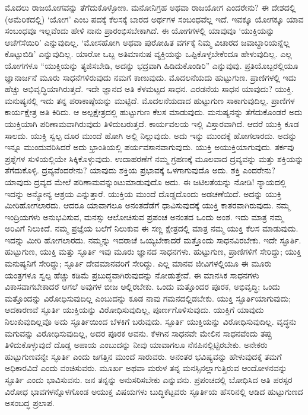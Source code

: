ಮೊದಲು ರಾಜಯೋಗವನ್ನು ತೆಗೆದುಕೊಳ್ಳೋಣ. ಮನೋನಿಗ್ರಹ ಅಥವಾ ರಾಜಯೋಗ ಎಂದರೇನು? ಈ ದೇಶದಲ್ಲಿ (ಅಮೆರಿಕದಲ್ಲಿ) ‘ಯೋಗ’ ಎಂಬ ಪದಕ್ಕೆ ಕೆಲಸಕ್ಕೆ ಬಾರದ ಅರ್ಥಗಳ ಸಂಬಂಧವೆಲ್ಲ ಇದೆ. ಇವಕ್ಕೂ ಯೋಗಕ್ಕೂ ಯಾವ ಸಂಬಂಧವೂ ಇಲ್ಲವೆಂದು ಹೇಳಿ ನಾನು ಪ್ರಾರಂಭಿಸಬೇಕಾಗಿದೆ. ಈ ಯೋಗಗಳಲ್ಲಿ ಯಾವುವೂ ‘ಯುಕ್ತಿಯನ್ನು ಆಚೆಗೆಸೆಯಿರಿ’ ಎನ್ನುವುದಿಲ್ಲ. ‘ಮೋಸಹೋಗಿ ಅಥವಾ ಪುರೋಹಿತ ವರ್ಗಕ್ಕೆ ನಿಮ್ಮ ವಿಚಾರದ ಜವಾಬ್ದಾರಿಯನ್ನೆಲ್ಲ ಕೊಟ್ಟುಬಿಡಿ’ ಎನ್ನುವುದಿಲ್ಲ. ಯಾರೋ ಒಬ್ಬ ಅತಿಮಾನುಷ ವ್ಯಕ್ತಿಯನ್ನು ಒಪ್ಪಿಕೊಳ್ಳಬೇಕೆಂದೂ ಹೇಳುವುದಿಲ್ಲ. ಎಲ್ಲ ಯೋಗಗಳೂ “ಯುಕ್ತಿಯನ್ನು ತ್ಯಜಿಸಬೇಡಿ, ಅದನ್ನು ಭದ್ರವಾಗಿ ಹಿಡಿದುಕೊಂಡಿರಿ” ಎನ್ನುವುವು. ಪ್ರತಿಯೊಬ್ಬರಲ್ಲಿಯೂ ಜ್ಞಾನಾರ್ಜನೆ ಮೂರು ಸಾಧನೆಗಳಿರುವುದು ನಮಗೆ ಕಾಣುವುದು. ಮೊದಲನೆಯದು ಹುಟ್ಟುಗುಣ. ಪ್ರಾಣಿಗಳಲ್ಲಿ ಇದು ಹೆಚ್ಚು ಅಭಿವೃದ್ಧಿಯಾಗಿರುತ್ತದೆ. ಇದೇ ಜ್ಞಾನದ ಅತಿ ಕೆಳಮಟ್ಟದ ಸಾಧನ. ಎರಡನೆಯ ಸಾಧನ ಯಾವುದು? ಯುಕ್ತಿ. ಮನುಷ್ಯನಲ್ಲಿ ಇದು ತನ್ನ ಪರಾಕಾಷ್ಠೆಯನ್ನು ಮುಟ್ಟಿದೆ. ಮೊದಲನೆಯದಾದ ಹುಟ್ಟುಗುಣ ಸಾಕಾಗುವುದಿಲ್ಲ. ಪ್ರಾಣಿಗಳ ಕಾರ್ಯಕ್ಷೇತ್ರ ಅತಿ ಕಿರಿದು. ಆ ಅಲ್ಪಕ್ಷೇತ್ರದಲ್ಲಿ ಹುಟ್ಟುಗುಣ ಕೆಲಸ ಮಾಡುವುದು. ಮನುಷ್ಯನನ್ನು ತೆಗೆದುಕೊಂಡರೆ ಅದು ಯುಕ್ತಿಯಾಗಿ ಪರಿಣಾಮವಾಗಿರುವುದು ತಿಳಿದುಬರುತ್ತದೆ. ಕಾರ್ಯವಲಯ ಇಲ್ಲಿ ವಿಸ್ತಾರವಾಗಿದೆ. ಆದರೆ ಯುಕ್ತಿ ಕೂಡ ಸಾಲದು. ಯುಕ್ತಿ ಸ್ವಲ್ಪ ದೂರ ಮುಂದೆ ಹೋಗಿ ಅಲ್ಲಿ ನಿಲ್ಲುವುದು. ಅದು ಇನ್ನು ಮುಂದಕ್ಕೆ ಹೋಗಲಾರದು. ಅದನ್ನು ಇನ್ನೂ ಮುಂದುವರಿಸಿದರೆ ಅದು ಭ್ರಾಂತಿಯಲ್ಲಿ ಪರ್ಯವಸಾನವಾಗುವುದು. ಯುಕ್ತಿ ಅಯುಕ್ತಿಯಾಗುವುದು. ತರ್ಕವು ಪ್ರಶ್ನೆಗಳ ಸುಳಿಯಲ್ಲಿಯೇ ಸಿಕ್ಕಿಕೊಳ್ಳುವುದು. ಉದಾಹರಣೆಗೆ ನಮ್ಮ ಗ್ರಹಣಕ್ಕೆ ಮೂಲವಾದ ದ್ರವ್ಯವನ್ನು ಮತ್ತು ಶಕ್ತಿಯನ್ನು ತೆಗೆದುಕೊಳ್ಳಿ. ದ್ರವ್ಯವೆಂದರೇನು? ಯಾವುದು ಶಕ್ತಿಯ ಪ್ರಭಾವಕ್ಕೆ ಒಳಗಾಗುವುದೊ ಅದು. ಶಕ್ತಿ ಎಂದರೇನು? ಯಾವುದು ದ್ರವ್ಯದ ಮೇಲೆ ಪರಿಣಾಮವನ್ನುಂಟುಮಾಡುವುದೊ ಅದು. ಈ ಜಟಿಲತೆಯನ್ನು ನೋಡಿ! ನ್ಯಾಯದಲ್ಲಿ ಇದನ್ನು ಅನ್ಯೋನ್ಯ ಆಶ್ರಯ ಎನ್ನುತ್ತಾರೆ. ಯುಕ್ತಿಯ ಮುಂದೆ ದೊಡ್ಡದೊಂದು ಅಡಚಣೆಯಿದೆ. ಅದನ್ನು ಯುಕ್ತಿ ಮೀರಿಹೋಗಲಾರದು. ಆದರೂ ಯಾವಾಗಲೂ ಅನಂತದೆಡೆಗೆ ಧಾವಿಸುವುದಕ್ಕೆ ಯುಕ್ತಿ ಕಾತರವಾಗಿರುವುದು. ನಮ್ಮ ಇಂದ್ರಿಯಗಳು ಅನುಭವಿಸುವ, ಮನಸ್ಸು ಆಲೋಚಿಸುವ ಪ್ರಪಂಚ ಅನಂತದ ಒಂದು ಅಂಶ. ಇದು ಮಾತ್ರ ನಮ್ಮ ಅರಿವಿಗೆ ನಿಲುಕಿದೆ. ನಮ್ಮ ಪ್ರಜ್ಞೆಯ ಬಲೆಗೆ ನಿಲುಕುವ ಈ ಸಣ್ಣ ಕ್ಷೇತ್ರದಲ್ಲಿ ಮಾತ್ರ ನಮ್ಮ ಯುಕ್ತಿ ಕೆಲಸ ಮಾಡುವುದು. ಇದನ್ನು ಮೀರಿ ಹೋಗಲಾರದು. ನಮ್ಮನ್ನು ಇದರಾಚೆ ಒಯ್ಯಬೇಕಾದರೆ ಮತ್ತೊಂದು ಸಾಧನವಿರಬೇಕು. ಇದೇ ಸ್ಫೂರ್ತಿ. ಹುಟ್ಟುಗುಣ, ಯುಕ್ತಿ ಮತ್ತು ಸ್ಫೂರ್ತಿ ಇವು ಮೂರು ಜ್ಞಾನದ ಸಾಧನಗಳು. ಹುಟ್ಟುಗುಣ, ಪ್ರಾಣಿಗಳಿಗೆ ಸೇರಿದ್ದು; ಯುಕ್ತಿ ಮನುಷ್ಯನಿಗೆ ಸೇರಿದ್ದು; ಸ್ಫೂರ್ತಿ ದೇವಮಾನವರಿಗೆ ಸೇರಿದ್ದು. ಎಲ್ಲ ಮಾನವ ಜೀವಿಗಳಲ್ಲಿಯೂ ಈ ಮೂರು ಯಂತ್ರಗಳೂ ಸ್ವಲ್ಪ ಹೆಚ್ಚು ಕಡಿಮೆ ಪ್ರಬುದ್ಧವಾಗಿರುವುದನ್ನು ನೋಡುತ್ತೇವೆ. ಈ ಮಾನಸಿಕ ಸಾಧನಗಳು ವಿಕಾಸವಾಗಬೇಕಾದರೆ ಆಗಲೆ ಅವುಗಳ ಬೀಜ ಅಲ್ಲಿರಬೇಕು. ಒಂದು ಮತ್ತೊಂದರ ಪೂರಕ, ಅಭಿವೃದ್ಧಿ; ಒಂದು ಮತ್ತೊಂದನ್ನು ವಿರೋಧಿಸುವುದಿಲ್ಲ ಎಂಬುದನ್ನು ಕೂಡ ನಾವು ಗಮನದಲ್ಲಿಡಬೇಕು. ಯುಕ್ತಿ ಸ್ಫೂರ್ತಿಯಾಗುವುದು; ಆದಕಾರಣವೆ ಸ್ಫೂರ್ತಿ ಯುಕ್ತಿಯನ್ನು ವಿರೋಧಿಸುವುದಿಲ್ಲ, ಪೂರ್ಣಗೊಳಿಸುವುದು. ಯುಕ್ತಿಗೆ ಯಾವುದು ನಿಲುಕುವುದಿಲ್ಲವೊ ಅದು ಸ್ಫೂರ್ತಿಯಿಂದ ಬೆಳಕಿಗೆ ಬರುವುದು. ಸ್ಫೂರ್ತಿ ಯುಕ್ತಿಯನ್ನು ವಿರೋಧಿಸುವುದಿಲ್ಲ. ವೃದ್ಧನು ಮಗುವನ್ನು ವಿರೋಧಿಸುವುದಿಲ್ಲ, ಅದರ ಪೂರಕ ಅವನು. ಕೆಳಗಿನ ಸಾಧನವೇ ಮೇಲಿನ ಸಾಧನವೆಂದು ತಪ್ಪು ತಿಳಿದುಕೊಳ್ಳುವುದೆ ದೊಡ್ಡ ಅಪಾಯ ಎಂಬುದನ್ನು ನೀವು ಯಾವಾಗಲೂ ನೆನಪಿನಲ್ಲಿಟ್ಟಿರಬೇಕು. ಅನೇಕರು ಹುಟ್ಟುಗುಣವನ್ನೇ ಸ್ಫೂರ್ತಿ ಎಂದು ಜಗತ್ತಿನ ಮುಂದೆ ಸಾರುವರು. ಅನಂತರ ಭವಿಷ್ಯವನ್ನು ಹೇಳುವುದಕ್ಕೆ ತಮಗೆ ಅಧಿಕಾರವಿದೆ ಎಂದು ವಂಚಿಸುವರು. ಮೂರ್ಖ ಅಥವಾ ಮರುಳ ತನ್ನ ಮನಸ್ಸಿನಲ್ಲಾಗುತ್ತಿರುವ ಆಂದೋಳನವನ್ನು ಸ್ಫೂರ್ತಿ ಎಂದು ಭಾವಿಸುವನು. ಜನ ತನ್ನನ್ನು ಅನುಸರಿಸಬೇಕು ಎನ್ನುವನು. ಪ್ರಪಂಚದಲ್ಲಿ ಬೋಧಿಸಿದ ಅತಿ ಪರಸ್ಪರ ವಿರೋಧ ಭಾವಗಳನ್ನೊಳಗೊಂಡ ಅಯುಕ್ತ ವಿಷಯಗಳು ಬುದ್ಧಿಕೆಟ್ಟವರು ಸ್ಫೂರ್ತಿಯ ಹೆಸರಿನಲ್ಲಿ ಆಡಿದ ಹುಟ್ಟುಗುಣದ ಅಸಂಬದ್ಧ ಪ್ರಲಾಪ.

